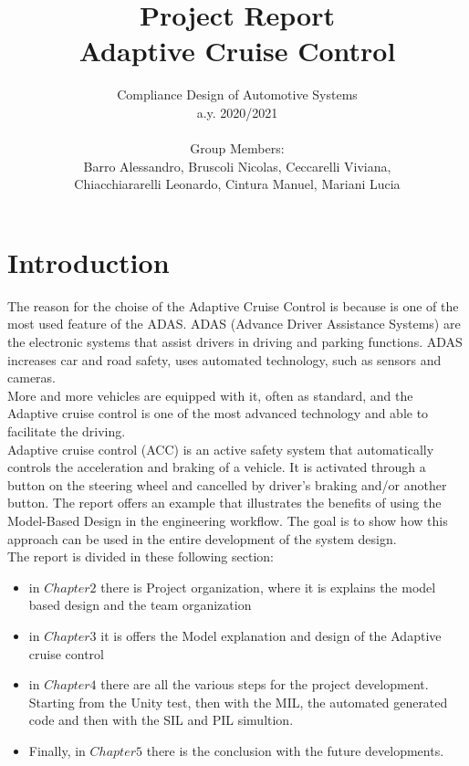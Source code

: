 \documentclass[12pt,a4paper]{report}
\begin{document}
	
	\author{Compliance Design of Automotive Systems \\
		a.y. 2020/2021\\\\
		Group Members:\\
		Barro Alessandro, Bruscoli Nicolas, Ceccarelli Viviana, \\
		Chiacchiararelli Leonardo, Cintura Manuel, Mariani Lucia\\
	}
	\title{Project Report\\
		Adaptive Cruise Control
	}
	\maketitle
	
\tableofcontents
\listoffigures

\chapter{Introduction}
The reason for the choise of the Adaptive Cruise Control is because is one of the most used feature of the ADAS. ADAS (Advance Driver Assistance Systems) are the electronic systems that assist drivers in driving and parking functions. ADAS increases car and road safety, uses automated technology, such as sensors and cameras.\\ More and more vehicles are equipped with it, often as standard, and the Adaptive cruise control is one of the most advanced technology and able to facilitate the driving.\\
Adaptive cruise control (ACC) is an active safety system that automatically controls the acceleration and braking of a vehicle. It is activated through a button on the steering wheel and cancelled by driver’s braking and/or another button.
The report offers an example that illustrates the benefits of using the Model-Based Design in the engineering workflow.
The goal is to show how this approach can be used in the entire development of the system design.\\
The report is divided in these following section:
\begin{itemize}
	\item in $Chapter 2$ there is Project organization, where it is explains the model based design and the team organization
	\item in $Chapter 3$ it is offers the Model explanation and design of the Adaptive cruise control
	\item in $Chapter 4$ there are all the various steps for the project development. Starting from the Unity test, then with the MIL, the automated generated code and then with the SIL and PIL simultion.
	\item Finally, in $Chapter 5$ there is the conclusion with the future developments.
\end{itemize}
\end{document}
